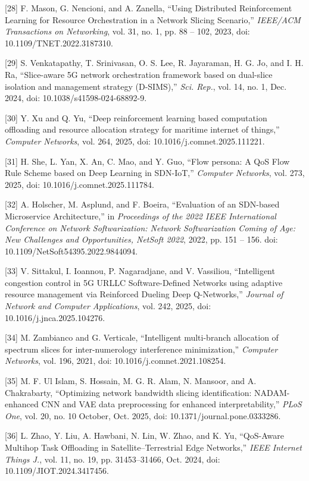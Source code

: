 {[}28{]} F. Mason, G. Nencioni, and A. Zanella, ``Using Distributed Reinforcement Learning for Resource Orchestration in a Network Slicing Scenario,'' \emph{IEEE/ACM Transactions on Networking}, vol. 31, no. 1, pp. 88 -- 102, 2023, doi: 10.1109/TNET.2022.3187310.

{[}29{]} S. Venkatapathy, T. Srinivasan, O. S. Lee, R. Jayaraman, H. G. Jo, and I. H. Ra, ``Slice-aware 5G network orchestration framework based on dual-slice isolation and management strategy (D-SIMS),'' \emph{Sci. Rep.}, vol. 14, no. 1, Dec. 2024, doi: 10.1038/s41598-024-68892-9.

{[}30{]} Y. Xu and Q. Yu, ``Deep reinforcement learning based computation offloading and resource allocation strategy for maritime internet of things,'' \emph{Computer Networks}, vol. 264, 2025, doi: 10.1016/j.comnet.2025.111221.

{[}31{]} H. She, L. Yan, X. An, C. Mao, and Y. Guo, ``Flow persona: A QoS Flow Rule Scheme based on Deep Learning in SDN-IoT,'' \emph{Computer Networks}, vol. 273, 2025, doi: 10.1016/j.comnet.2025.111784.

{[}32{]} A. Holscher, M. Asplund, and F. Boeira, ``Evaluation of an SDN-based Microservice Architecture,'' in \emph{Proceedings of the 2022 IEEE International Conference on Network Softwarization: Network Softwarization Coming of Age: New Challenges and Opportunities, NetSoft 2022}, 2022, pp. 151 -- 156. doi: 10.1109/NetSoft54395.2022.9844094.

{[}33{]} V. Sittakul, I. Ioannou, P. Nagaradjane, and V. Vassiliou, ``Intelligent congestion control in 5G URLLC Software-Defined Networks using adaptive resource management via Reinforced Dueling Deep Q-Networks,'' \emph{Journal of Network and Computer Applications}, vol. 242, 2025, doi: 10.1016/j.jnca.2025.104276.

{[}34{]} M. Zambianco and G. Verticale, ``Intelligent multi-branch allocation of spectrum slices for inter-numerology interference minimization,'' \emph{Computer Networks}, vol. 196, 2021, doi: 10.1016/j.comnet.2021.108254.

{[}35{]} M. F. Ul Islam, S. Hossain, M. G. R. Alam, N. Mansoor, and A. Chakrabarty, ``Optimizing network bandwidth slicing identification: NADAM-enhanced CNN and VAE data preprocessing for enhanced interpretability,'' \emph{PLoS One}, vol. 20, no. 10 October, Oct. 2025, doi: 10.1371/journal.pone.0333286.

{[}36{]} L. Zhao, Y. Liu, A. Hawbani, N. Lin, W. Zhao, and K. Yu, ``QoS-Aware Multihop Task Offloading in Satellite--Terrestrial Edge Networks,'' \emph{IEEE Internet Things J.}, vol. 11, no. 19, pp. 31453--31466, Oct. 2024, doi: 10.1109/JIOT.2024.3417456.

